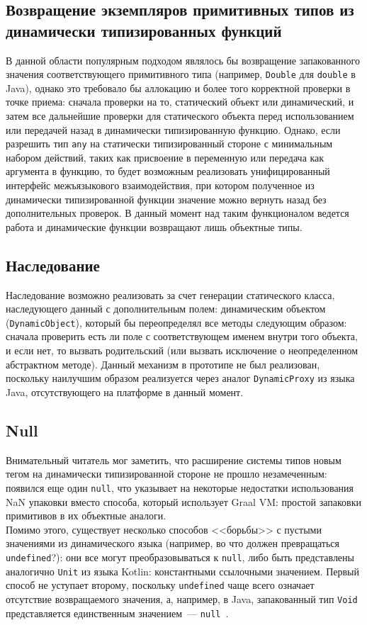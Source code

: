 \documentclass[times
,titlepage
]{itmo-student-thesis}
\begin{document}
\subsection{Возвращение экземпляров примитивных типов из динамически типизированных функций}
В данной области популярным подходом являлось бы возвращение запакованного значения соответствующего примитивного типа (например, \texttt{Double} для \texttt{double} в Java), однако это требовало бы аллокацию и более того корректной проверки в точке приема: сначала проверки на то, статический объект или динамический, и затем все дальнейшие проверки для статического объекта перед использованием или передачей назад в динамически типизированную функцию. Однако, если разрешить тип \texttt{any} на статически типизированный стороне с минимальным набором действий, таких как присвоение в переменную или передача как аргумента в функцию, то будет возможным реализовать унифицированный интерфейс межъязыкового взаимодействия, при котором полученное из динамически типизированной функции значение можно вернуть назад без дополнительных проверок. В данный момент над таким функционалом ведется работа и динамические функции возвращают лишь объектные типы.

\subsection{Наследование}
Наследование возможно реализовать за счет генерации статического класса, наследующего данный с дополнительным полем: динамическим объектом (\texttt{DynamicObject}), который бы переопределял все методы следующим образом: сначала проверить есть ли поле с соответствующем именем внутри того объекта, и если нет, то вызвать родительский (или вызвать исключение о неопределенном абстрактном методе). Данный механизм в прототипе не был реализован, поскольку наилучшим образом реализуется через аналог \texttt{DynamicProxy} из языка Java, отсутствующего на платформе в данный момент.
\subsection{Null}
Внимательный читатель мог заметить, что расширение системы типов новым тегом на динамически типизированной стороне не прошло незамеченным: появился еще один \texttt{null}, что указывает на некоторые недостатки использования NaN упаковки вместо способа, который использует Graal VM: простой запаковки примитивов в их объектные аналоги.\\
Помимо этого, существует несколько способов <<борьбы>> с пустыми значениями из динамического языка (например, во что должен превращаться \texttt{undefined}?): они все могут преобразовываться к \texttt{null}, либо быть представлены аналогично \texttt{Unit} из языка Kotlin: константными ссылочными значением. Первый способ не уступает второму, поскольку \texttt{undefined} чаще всего означает отсутствие возвращаемого значения, а, например, в Java, запакованный тип \texttt{Void} представляется единственным значением~--- \texttt{null}~\cite{java-lang-void}.
\end{document}
